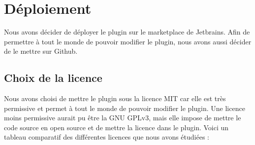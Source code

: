 \chapter{Déploiement}
\noindent Nous avons décider de déployer le plugin sur le marketplace de Jetbrains.
Afin de permettre à tout le monde de pouvoir modifier le plugin, nous avons aussi décider de le mettre sur Github.


\section{Choix de la licence}
\noindent Nous avons choisi de mettre le plugin sous la licence MIT car elle est très permissive et permet à tout le monde de pouvoir modifier le plugin.
Une licence moins permissive aurait pu être la GNU GPLv3, mais elle impose de mettre le code source en open source et de mettre la licence dans le plugin.
\newdoubleline Voici un tableau comparatif des différentes licences que nous avons étudiées :

